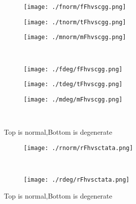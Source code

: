 \documentclass[aps,floats,floatfix,nofootinbib]{revtex4-1}
\begin{document}
\begin{center}
\begin{figure}
\begin{subfigure}{0.3\textwidth}
\texttt{[image: ./fnorm/fFhvscgg.png]}
\label{}
\end{subfigure}
\begin{subfigure}{0.3\textwidth}
\texttt{[image: ./tnorm/tFhvscgg.png]}
\label{}
\end{subfigure}
\begin{subfigure}{0.3\textwidth}
\texttt{[image: ./mnorm/mFhvscgg.png]}
\label{}
\end{subfigure}\\
\begin{subfigure}{0.3\textwidth}
\texttt{[image: ./fdeg/fFhvscgg.png]}
\label{}
\end{subfigure}
\begin{subfigure}{0.3\textwidth}
\texttt{[image: ./tdeg/tFhvscgg.png]}
\label{}
\end{subfigure}
\begin{subfigure}{0.3\textwidth}
\texttt{[image: ./mdeg/mFhvscgg.png]}
\label{}
\end{subfigure}\\
\caption{Top is normal,Bottom is degenerate}
\end{figure}
\end{center}

\begin{center}
\begin{figure}
\begin{subfigure}{0.95\textwidth}
\texttt{[image: ./rnorm/rFhvsctata.png]}
\label{}
\end{subfigure}\\
\begin{subfigure}{0.95\textwidth}
\texttt{[image: ./rdeg/rFhvsctata.png]}
\label{}
\end{subfigure}
\caption{Top is normal,Bottom is degenerate}
\end{figure}
\end{center}
\end{document}
